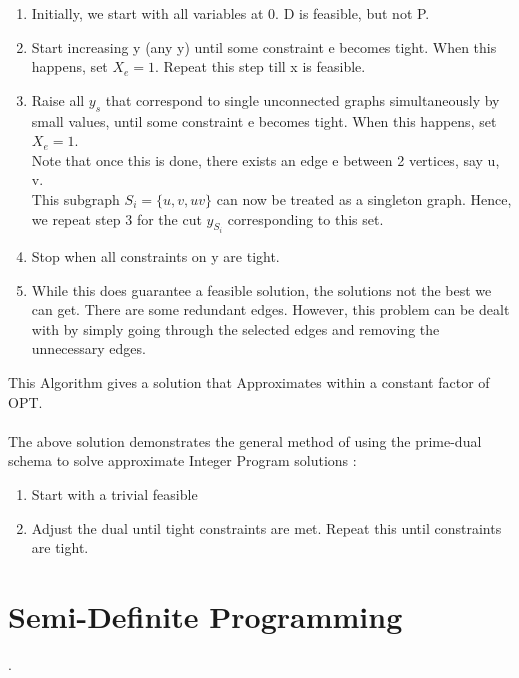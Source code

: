 \documentclass[12pt]{report}
\begin{document}
\begin{enumerate}
  \item Initially, we start with all variables at 0. D is feasible, but not P.
  \item Start increasing y (any y) until some constraint e becomes tight. When this 					happens, set $X_e = 1$. Repeat this step till x is feasible.
  \item Raise all $y_s$ that correspond to single unconnected graphs simultaneously by 				small values, until some constraint e becomes tight. When this happens, set$X_e=1$.
  		\\Note that once this is done, there exists an edge e between 2 vertices, say u, v.
  		\\This subgraph $S_i = \{u, v, uv\}$ can now be treated as a singleton graph. 				Hence, we repeat step 3 for the cut $y_{S_i}$ corresponding to this set. 
  \item Stop when all constraints on y are tight.
  \item While this does guarantee a feasible solution, the solutions not the best we can get. There are some redundant edges. However, this problem can be dealt with by simply going through the selected edges and removing the unnecessary edges.
\end{enumerate}

This Algorithm gives a solution that Approximates within a constant factor of OPT.\\\\


The above solution demonstrates the general method of using the prime-dual schema to solve approximate Integer Program solutions :
\begin{enumerate}
  \item Start with a trivial feasible 
  \item Adjust the dual until tight constraints are met. 
  		Repeat this until constraints are tight.
\end{enumerate}

\chapter{Semi-Definite Programming}



.
\end{document}
